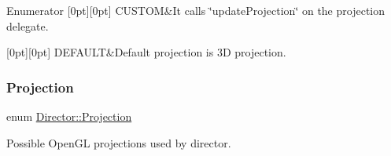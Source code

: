 \begin{DoxyEnumFields}{Enumerator}
[0pt][0pt]{}\mbox{\label{classDirector_aaa3d9a0eac7c805d87ecba67c974fcf2a72baef04098f035e8a320b03ad197818}} 
C\+U\+S\+T\+OM&It calls \char`\"{}update\+Projection\char`\"{} on the projection delegate. \\
\hline

[0pt][0pt]{}\mbox{\label{classDirector_aaa3d9a0eac7c805d87ecba67c974fcf2a5b39c8b553c821e7cddc6da64b5bd2ee}} 
D\+E\+F\+A\+U\+LT&Default projection is 3D projection. \\
\hline

\end{DoxyEnumFields}
\mbox{\label{classDirector_aaa3d9a0eac7c805d87ecba67c974fcf2}} 
\subsubsection{\texorpdfstring{Projection}{Projection}\hspace{0.1cm}{\footnotesize\ttfamily [2/2]}}
{\footnotesize\ttfamily enum \hyperlink{classDirector_aaa3d9a0eac7c805d87ecba67c974fcf2}{Director\+::\+Projection}\hspace{0.3cm}{\ttfamily [strong]}}



Possible Open\+GL projections used by director. 

